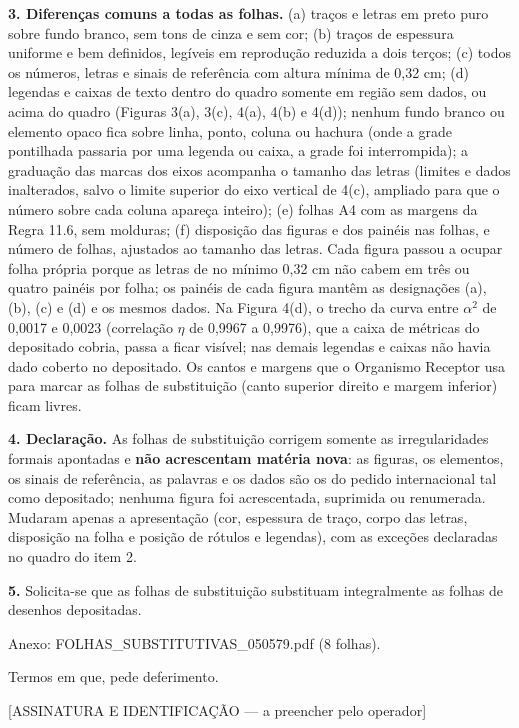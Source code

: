 \documentclass[a4paper,11pt]{article}
\begin{document}
\textbf{3. Diferenças comuns a todas as folhas.} (a) traços e letras em preto puro sobre fundo branco, sem tons de cinza e sem cor; (b) traços de espessura uniforme e bem definidos, legíveis em reprodução reduzida a dois terços; (c) todos os números, letras e sinais de referência com altura mínima de 0,32 cm; (d) legendas e caixas de texto dentro do quadro somente em região sem dados, ou acima do quadro (Figuras 3(a), 3(c), 4(a), 4(b) e 4(d)); nenhum fundo branco ou elemento opaco fica sobre linha, ponto, coluna ou hachura (onde a grade pontilhada passaria por uma legenda ou caixa, a grade foi interrompida); a graduação das marcas dos eixos acompanha o tamanho das letras (limites e dados inalterados, salvo o limite superior do eixo vertical de 4(c), ampliado para que o número sobre cada coluna apareça inteiro); (e) folhas A4 com as margens da Regra 11.6, sem molduras; (f) disposição das figuras e dos painéis nas folhas, e número de folhas, ajustados ao tamanho das letras. Cada figura passou a ocupar folha própria porque as letras de no mínimo 0,32 cm não cabem em três ou quatro painéis por folha; os painéis de cada figura mantêm as designações (a), (b), (c) e (d) e os mesmos dados. Na Figura 4(d), o trecho da curva entre $\alpha^2$ de 0,0017 e 0,0023 (correlação $\eta$ de 0,9967 a 0,9976), que a caixa de métricas do depositado cobria, passa a ficar visível; nas demais legendas e caixas não havia dado coberto no depositado. Os cantos e margens que o Organismo Receptor usa para marcar as folhas de substituição (canto superior direito e margem inferior) ficam livres.

\textbf{4. Declaração.} As folhas de substituição corrigem somente as irregularidades formais apontadas e \textbf{não acrescentam matéria nova}: as figuras, os elementos, os sinais de referência, as palavras e os dados são os do pedido internacional tal como depositado; nenhuma figura foi acrescentada, suprimida ou renumerada. Mudaram apenas a apresentação (cor, espessura de traço, corpo das letras, disposição na folha e posição de rótulos e legendas), com as exceções declaradas no quadro do item 2.

\textbf{5.} Solicita-se que as folhas de substituição substituam integralmente as folhas de desenhos depositadas.

Anexo: FOLHAS\_SUBSTITUTIVAS\_050579.pdf (8 folhas).

Termos em que, pede deferimento.

\vspace{1.2cm}[ASSINATURA E IDENTIFICAÇÃO --- a preencher pelo operador]
\end{document}
